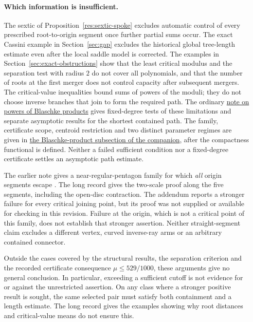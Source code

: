 \documentclass[11pt]{article}
\begin{document}
\paragraph{Which information is insufficient.}
The sextic of Proposition~\ref{res:sextic-spoke} excludes automatic control of
every prescribed root-to-origin segment once further partial sums occur.  The exact
Cassini example in Section~\ref{sec:gap} excludes the historical global
tree-length estimate even after the local saddle model is corrected.  The examples
in Section~\ref{sec:exact-obstructions} show that the least critical modulus
and the separation test with radius $2$ do not cover all polynomials, and that the number of roots at the first merger
does not control capacity after subsequent mergers.  The critical-value inequalities bound sums of powers of the moduli; they
do not choose inverse branches that join to form the required path.
The ordinary
\href{https://github.com/wcook04/plectis-erdos/blob/f36a98bf3d3e6f65f1074e3b800e3293d5b8a51a/ErdosProblems/Erdos1041/BlaschkePowerCriticalSpectra.md}{note on powers of Blaschke products}
gives fixed-degree tests of these limitations and separate asymptotic
results for the shortest contained path. The family, certificate scope,
centroid restriction and two distinct parameter regimes are given in
\href{erdos1041-lemniscate-reasoning-surface.pdf\#blaschke-product-examples}{the Blaschke-product subsection of the companion}, after the compactness functional is defined.
Neither a failed sufficient condition nor a fixed-degree certificate
settles an asymptotic path estimate.

The earlier note gives a near-regular-pentagon family for which
\emph{all} origin segments escape \cite[Proposition~A of the preserved earlier
note]{revision2026}. The long record gives the two-scale proof along the
five segments, including the open-disc contraction.
The addendum reports a stronger failure for every critical joining point,
but its proof was not supplied or available for checking in this revision.
Failure at the origin, which is not a critical point of this family,
does not establish that stronger assertion. Neither straight-segment
claim excludes a different vertex, curved inverse-ray arms or an
arbitrary contained connector.

Outside the cases covered by the structural results, the separation
criterion and the recorded certificate consequence $\mu\le529/1000$,
these arguments give no general conclusion. In particular, exceeding a
sufficient cutoff is not evidence for or against the unrestricted
assertion. On any class where a stronger
positive result is sought, the same selected pair must satisfy both
containment and a length estimate. The long record gives the examples
showing why root distances and critical-value means do not ensure this.
\end{document}
